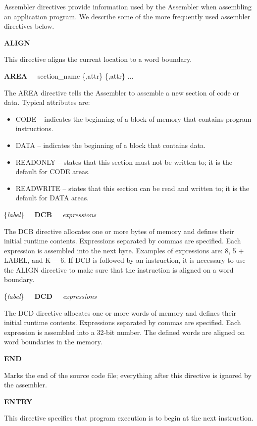 \documentclass[11pt, twoside, pdftex]{article}
\begin{document}
Assembler directives provide information used by the Assembler 
when assembling an application program.
We describe some of the more frequently used assembler directives below.


\noindent
{\bf ALIGN}

\noindent
This directive aligns the current location to a word boundary.


\noindent
{\bf AREA}~~~section\_name \{,attr\} \{,attr\} ...

\noindent
The AREA directive tells the Assembler to assemble a new section
of code or data. Typical attributes are:
\begin{itemize}
\item {\sf CODE} -- indicates the beginning of a block of memory
that contains program instructions.
\item {\sf DATA} -- indicates the beginning of a block that
contains data.
\item {\sf READONLY} -- states that this section must not be
written to; it is the default for CODE areas.
\item {\sf READWRITE} -- states that this section can be read and written to; it is the default for DATA areas.
\end{itemize}


\noindent
\{{\it label}\}~~~{\bf DCB}~~~{\it expressions}

\noindent
The DCB directive allocates one or more bytes of memory and
defines their initial runtime contents. 
\noindent
Expressions separated by commas are specified. Each expression is assembled into the next byte. Examples of expressions are: 
8, 5 + LABEL, and K $-$ 6.
If DCB is followed by an instruction, it is necessary to use the
ALIGN directive to make sure that the instruction is aligned on 
a word boundary.


\noindent
\{{\it label}\}~~~{\bf DCD}~~~{\it expressions}

\noindent
The DCD directive allocates one or more words of memory and
defines their initial runtime contents. 
Expressions separated by commas are specified. Each expression is assembled into a 32-bit number.
The defined words are aligned on word boundaries in the memory.


\noindent
{\bf END}

\noindent
Marks the end of the source code file; everything after this
directive is ignored by the assembler.


\noindent
{\bf ENTRY}

\noindent
This directive specifies that program execution is to begin at 
the next instruction.
\end{document}

